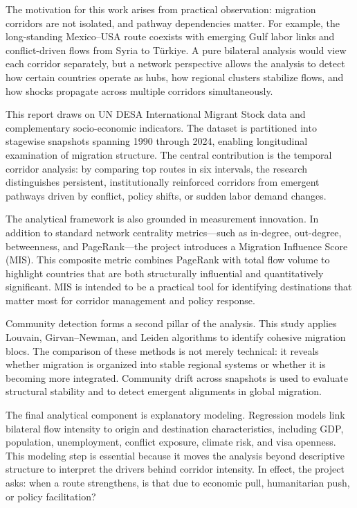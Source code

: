 \documentclass[12pt]{report}
\begin{document}
The motivation for this work arises from practical observation: migration corridors are not isolated, and pathway dependencies matter. For example, the long-standing Mexico--USA route coexists with emerging Gulf labor links and conflict-driven flows from Syria to Türkiye. A pure bilateral analysis would view each corridor separately, but a network perspective allows the analysis to detect how certain countries operate as hubs, how regional clusters stabilize flows, and how shocks propagate across multiple corridors simultaneously.

This report draws on UN DESA International Migrant Stock data and complementary socio-economic indicators. The dataset is partitioned into stagewise snapshots spanning 1990 through 2024, enabling longitudinal examination of migration structure. The central contribution is the temporal corridor analysis: by comparing top routes in six intervals, the research distinguishes persistent, institutionally reinforced corridors from emergent pathways driven by conflict, policy shifts, or sudden labor demand changes.

The analytical framework is also grounded in measurement innovation. In addition to standard network centrality metrics—such as in-degree, out-degree, betweenness, and PageRank—the project introduces a Migration Influence Score (MIS). This composite metric combines PageRank with total flow volume to highlight countries that are both structurally influential and quantitatively significant. MIS is intended to be a practical tool for identifying destinations that matter most for corridor management and policy response.

Community detection forms a second pillar of the analysis. This study applies Louvain, Girvan--Newman, and Leiden algorithms to identify cohesive migration blocs. The comparison of these methods is not merely technical: it reveals whether migration is organized into stable regional systems or whether it is becoming more integrated. Community drift across snapshots is used to evaluate structural stability and to detect emergent alignments in global migration.

The final analytical component is explanatory modeling. Regression models link bilateral flow intensity to origin and destination characteristics, including GDP, population, unemployment, conflict exposure, climate risk, and visa openness. This modeling step is essential because it moves the analysis beyond descriptive structure to interpret the drivers behind corridor intensity. In effect, the project asks: when a route strengthens, is that due to economic pull, humanitarian push, or policy facilitation?
\end{document}
